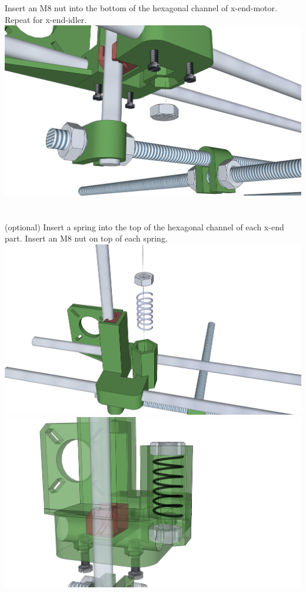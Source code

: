 \documentclass[twoside,a4paper,titlepage]{memoir}
\begin{document}
	\section{}
	Insert an M8 nut into the bottom of the hexagonal channel of x-end-motor. Repeat for x-end-idler.\\
	\includegraphics[width=1\linewidth]{graphics/ch8_16.png}
	
	\section{}
	(optional) Insert a spring into the top of the hexagonal channel of each x-end part. Insert an M8 nut on
	top of each spring.\\
	\includegraphics[width=1\linewidth]{graphics/ch8_17_1.png}
	\includegraphics[width=1\linewidth]{graphics/ch8_17_2.png}
	
\end{document}
